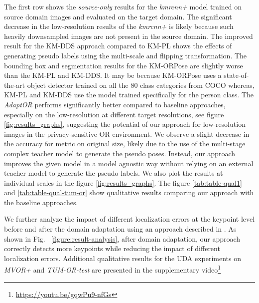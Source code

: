 The first row shows the \emph{source-only} results for the \emph{kmrcnn+} model trained on source domain images and evaluated on the target domain. The significant decrease in the low-resolution results of the  \emph{kmrcnn+} is likely because such heavily downsampled images are not present in the source domain. The improved result for the KM-DDS approach compared to KM-PL shows the effects of generating pseudo labels using the multi-scale and flipping transformation. The bounding box and segmentation results for the KM-ORPose are slightly worse than the KM-PL and KM-DDS. It may be because KM-ORPose uses a state-of-the-art object detector trained on all the 80 class categories from COCO whereas, KM-PL and KM-DDS use the model trained specifically for the person class. The \emph{AdaptOR} performs significantly better compared to baseline approaches, especially on the low-resolution at different target resolutions, see figure \ref{fig:results_graphs}, suggesting the potential of our approach for low-resolution images in the privacy-sensitive OR environment. We observe a slight decrease in the accuracy for \emph{} metric on original size, likely due to the use of the multi-stage complex teacher model to generate the pseudo poses. Instead, our approach improves the given model in a model agnostic way without relying on an external teacher model to generate the pseudo labels. We also plot the results at individual scales in the figure \ref{fig:results_graphs}. The figure \ref{tab:table-qual1} and \ref{tab:table-qual-tum-or} show qualitative results comparing our approach with the baseline approaches. 

{\blue We further analyze the impact of different localization errors at the keypoint level before and after the domain adaptation using an approach described in \citep{ruggero2017benchmarking}. As shown in Fig. ~\ref{figure:result-analysis}, after domain adaptation, our approach correctly detects more keypoints while reducing the impact of different localization errors.} Additional qualitative results for the UDA experiments on \emph{MVOR+} and \emph{TUM-OR-test} are presented in the supplementary video\footnote{\url{https://youtu.be/gqwPu9-nfGs}}


